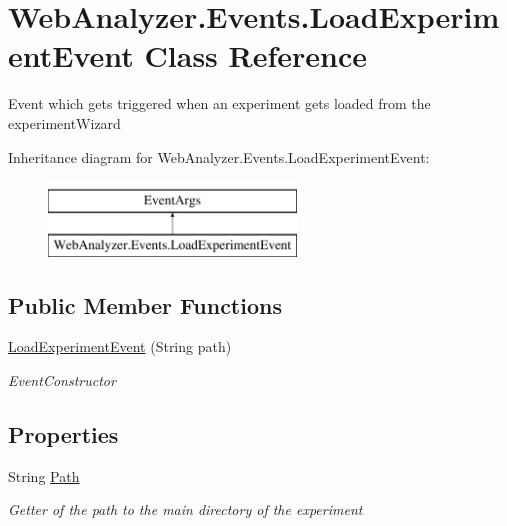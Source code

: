 \hypertarget{class_web_analyzer_1_1_events_1_1_load_experiment_event}{}\section{Web\+Analyzer.\+Events.\+Load\+Experiment\+Event Class Reference}
\label{class_web_analyzer_1_1_events_1_1_load_experiment_event}


Event which gets triggered when an experiment gets loaded from the experiment\+Wizard  


Inheritance diagram for Web\+Analyzer.\+Events.\+Load\+Experiment\+Event\+:\begin{figure}[H]
\begin{center}
\leavevmode
\includegraphics[height=2.000000cm]{class_web_analyzer_1_1_events_1_1_load_experiment_event}
\end{center}
\end{figure}
\subsection*{Public Member Functions}
\begin{DoxyCompactItemize}
\item 
\hyperlink{class_web_analyzer_1_1_events_1_1_load_experiment_event_a359c2a5d88c60ad3f993c43984b375a9}{Load\+Experiment\+Event} (String path)
\begin{DoxyCompactList}\small\item\em Event\+Constructor \end{DoxyCompactList}\end{DoxyCompactItemize}
\subsection*{Properties}
\begin{DoxyCompactItemize}
\item 
String \hyperlink{class_web_analyzer_1_1_events_1_1_load_experiment_event_ac86cf22d02cb0c13c9ea9437422b5142}{Path}
\begin{DoxyCompactList}\small\item\em Getter of the path to the main directory of the experiment \end{DoxyCompactList}\end{DoxyCompactItemize}
